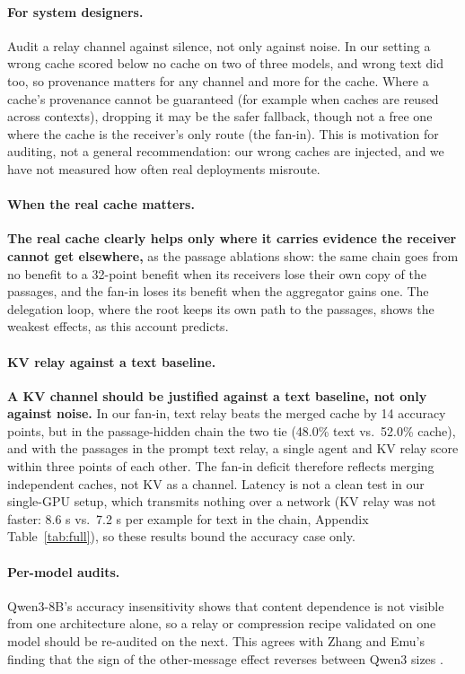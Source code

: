 \documentclass[11pt]{article}
\begin{document}
\paragraph{For system designers.} Audit a relay channel against silence,
not only against noise. In our setting a wrong cache scored below no cache on two
of three models, and wrong text did too, so provenance matters for any channel and
more for the cache. Where a cache's provenance cannot be guaranteed (for example
when caches are reused across contexts), dropping it may be the safer fallback,
though not a free one where the cache is the receiver's only route (the fan-in).
This is motivation for auditing, not a general recommendation: our wrong caches
are injected, and we have not measured how often real deployments misroute.

\paragraph{When the real cache matters.} \textbf{The real cache clearly helps
only where it carries evidence the receiver cannot get elsewhere,} as the
passage ablations show: the same chain goes from no benefit to a 32-point benefit
when its receivers lose their own copy of the passages, and the fan-in loses its
benefit when the aggregator gains one. The delegation loop, where
the root keeps its own path to the passages, shows the weakest effects, as this
account predicts.

\paragraph{KV relay against a text baseline.} \textbf{A KV channel should be
justified against a text baseline, not only against noise.} In our fan-in, text
relay beats the merged cache by 14 accuracy points, but in the passage-hidden chain
the two tie (48.0\% text vs.\ 52.0\% cache), and with the passages in the prompt
text relay, a single agent and KV relay score within three points of each other.
The fan-in deficit therefore reflects merging independent caches, not KV as a
channel. Latency is
not a clean test in our single-GPU setup, which transmits nothing over a network
(KV relay was not faster: 8.6 s vs.\ 7.2 s per example for text in the chain,
Appendix Table~\ref{tab:full}), so these results bound the accuracy case only.

\paragraph{Per-model audits.} Qwen3-8B's accuracy insensitivity shows that content
dependence is not visible from one architecture alone, so a relay or
compression recipe validated on one model should be re-audited on the
next. This agrees with Zhang and Emu's finding that the sign of the
other-message effect reverses between Qwen3 sizes \citep{zhangemu2026}.
\end{document}
